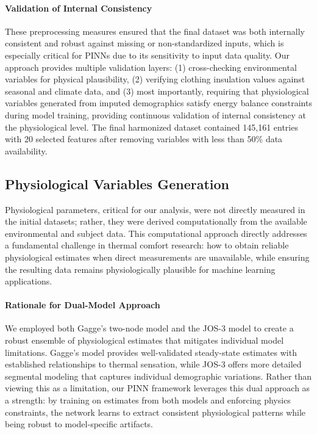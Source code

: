 \paragraph{Validation of Internal Consistency} These preprocessing measures ensured that the final dataset was both internally consistent and robust against missing or non-standardized inputs, which is especially critical for PINNs due to its sensitivity to input data quality. Our approach provides multiple validation layers: (1) cross-checking environmental variables for physical plausibility, (2) verifying clothing insulation values against seasonal and climate data, and (3) most importantly, requiring that physiological variables generated from imputed demographics satisfy energy balance constraints during model training, providing continuous validation of internal consistency at the physiological level. The final harmonized dataset contained 145,161 entries with 20 selected features after removing variables with less than 50\% data availability.

\subsection{Physiological Variables Generation}

Physiological parameters, critical for our analysis, were not directly measured in the initial datasets; rather, they were derived computationally from the available environmental and subject data. This computational approach directly addresses a fundamental challenge in thermal comfort research: how to obtain reliable physiological estimates when direct measurements are unavailable, while ensuring the resulting data remains physiologically plausible for machine learning applications.

\paragraph{Rationale for Dual-Model Approach} We employed both Gagge's two-node model and the JOS-3 model to create a robust ensemble of physiological estimates that mitigates individual model limitations. Gagge's model provides well-validated steady-state estimates with established relationships to thermal sensation, while JOS-3 offers more detailed segmental modeling that captures individual demographic variations. Rather than viewing this as a limitation, our PINN framework leverages this dual approach as a strength: by training on estimates from both models and enforcing physics constraints, the network learns to extract consistent physiological patterns while being robust to model-specific artifacts.

